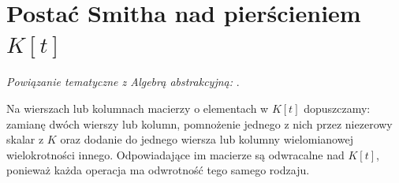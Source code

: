 \section{Postać Smitha nad pierścieniem \texorpdfstring{\(K[t]\)}{K[t]}}
\label{sec:lin19-smith}

\noindent\emph{Powiązanie tematyczne z Algebrą abstrakcyjną:} .


\begin{definicja}
\label{def:lin19-elementary}
Na wierszach lub kolumnach macierzy
o elementach w \(K[t]\) dopuszczamy:
zamianę dwóch wierszy lub kolumn,
pomnożenie jednego z nich
przez niezerowy skalar z \(K\)
oraz dodanie do jednego wiersza
lub kolumny wielomianowej wielokrotności innego.
Odpowiadające im macierze są odwracalne
nad \(K[t]\), ponieważ każda operacja
ma odwrotność tego samego rodzaju.
\end{definicja}

